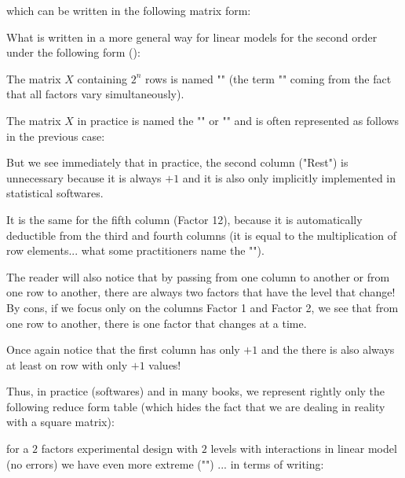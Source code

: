 	which can be written in the following matrix form:
	
	What is written in a more general way for linear models for the second order under the following form ():
	
	The matrix $X$ containing $2^n$ rows is named "" (the term "" coming from the fact that all factors vary simultaneously).
	
	The matrix $X$ in practice is named the "" or "" and is often represented as follows in the previous case:
	
	But we see immediately that in practice, the second column ("Rest") is unnecessary because it is always $+1$ and it is also only implicitly implemented in statistical softwares.
	
	It is the same for the fifth column (Factor 12), because it is automatically deductible from the third and fourth columns (it is equal to the multiplication of row elements... what some practitioners name the "").
	
	The reader will also notice that by passing from one column to another or from one row to another, there are always two factors that have the level that change! By cons, if we focus only on the columns Factor 1 and Factor 2, we see that from one row to another, there is one factor that changes at a time.
	\begin{tcolorbox}[title=Remark,colframe=black,arc=10pt]
	Once again notice that the first column has only $+1$ and the there is also always at least on row with only $+1$ values!
	\end{tcolorbox}
	Thus, in practice (softwares) and in many books, we represent rightly only the following reduce form table (which hides the fact that we are dealing in reality with a square matrix):
	
	for a $2$ factors experimental design with $2$ levels with interactions in linear model (no errors) we have even more extreme ("") ... in terms of writing:
	
